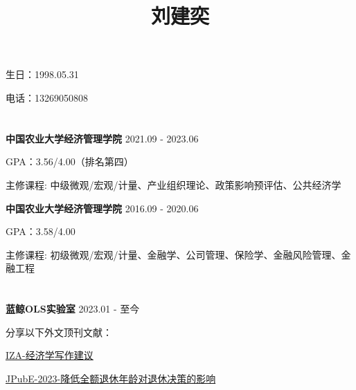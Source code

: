 \documentclass[UTF8,11pt]{ctexart}
\title{\vspace{-3em}刘建奕\vspace{-3em}} %
\author{}
\date{}
\begin{document}

\maketitle


\section{\underline{} } 


\hspace{2em}生日：1998.05.31   

电话：13269050808  


\section{\underline{}}

\hspace{2em}\textbf{中国农业大学经济管理学院}  \hfill 2021.09 - 2023.06 

GPA：3.56/4.00（排名第四）

主修课程: 中级微观/宏观/计量、产业组织理论、政策影响预评估、公共经济学

\textbf{中国农业大学经济管理学院}  \hfill 2016.09 - 2020.06 

GPA：3.58/4.00 

主修课程: 初级微观/宏观/计量、金融学、公司管理、保险学、金融风险管理、金融工程





\section{\underline{}}

\hspace{2em}\textbf{蓝鲸OLS实验室}  \tab{}  \hfill 2023.01 - 至今
 
 分享以下外文顶刊文献：

\href{https://mp.weixin.qq.com/s/3aoLsKh5J0J7huu1WbtVIg}{IZA-经济学写作建议}

\href{https://mp.weixin.qq.com/s/dz8usldAcGp7qXN-Kmf5LQ}{JPubE-2023-降低全额退休年龄对退休决策的影响}
\end{document}
